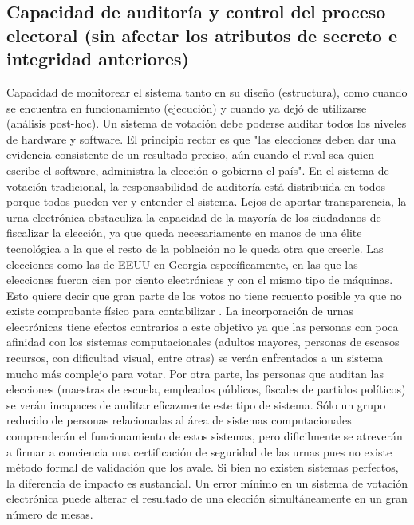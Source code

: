 \subsection{Capacidad de auditoría y control del proceso electoral (sin afectar los atributos de secreto e integridad anteriores)}
Capacidad de monitorear el sistema tanto en su diseño (estructura), como cuando se encuentra en funcionamiento (ejecución) y cuando ya dejó de utilizarse (análisis post-hoc). Un sistema de votación debe poderse auditar todos los niveles de hardware y software. El principio rector es que "las elecciones deben dar una evidencia consistente de un resultado preciso, aún cuando el rival sea quien escribe el software, administra la elección o gobierna el país".\newline
En el sistema de votación tradicional, la responsabilidad de auditoría está distribuida en todos porque todos pueden ver y entender el sistema. Lejos de aportar transparencia, la urna electrónica obstaculiza la capacidad de la mayoría de los ciudadanos de fiscalizar la elección, ya que queda necesariamente en manos de una élite tecnológica a la que el resto de la población no le queda otra que creerle. Las elecciones como las de EEUU en Georgia específicamente, en las que las elecciones fueron cien por ciento electrónicas y con el mismo tipo de máquinas. Esto quiere decir que gran parte de los votos no tiene recuento posible ya que no existe comprobante físico para contabilizar \cite{eleccionesGeorgia}.\newline
La incorporación de urnas electrónicas tiene efectos contrarios a este objetivo ya que las personas con poca afinidad con los sistemas computacionales (adultos mayores, personas de escasos recursos, con dificultad visual, entre otras) se verán enfrentados a un sistema mucho más complejo para votar. Por otra parte, las personas que auditan las elecciones (maestras de escuela, empleados públicos, fiscales de partidos políticos) se verán incapaces de auditar eficazmente este tipo de sistema. Sólo un grupo reducido de personas relacionadas al área de sistemas computacionales comprenderán el funcionamiento de estos sistemas, pero dificilmente se atreverán a firmar a conciencia una certificación de seguridad de las urnas pues no existe método formal de validación que los avale. Si bien no existen sistemas perfectos, la diferencia de impacto es sustancial. Un error mínimo en un sistema de votación electrónica puede alterar el resultado de una elección simultáneamente en un gran número de mesas.

